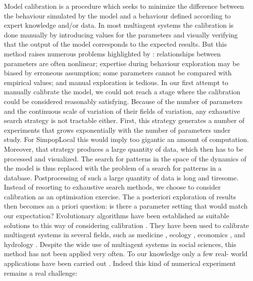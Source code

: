 Model calibration is a procedure which seeks to minimize the difference between the behaviour simulated by the model and a behaviour defined according to expert knowledge and/or data. In most multiagent systems the calibration is done manually by introducing values for the parameters and visually verifying that the output of the model corresponds to the expected results. But this method raises numerous problems highlighted by \textcite{Stonedahl2011a}: relationships between parameters are often nonlinear; expertise during behaviour exploration may be biased by erroneous assumption; some parameters cannot be compared with empirical values; and manual exploration is tedious. In our first attempt to manually calibrate the model, we could not reach a stage where the calibration could be considered reasonably satisfying. Because of the number of parameters and the continuous scale of variation of their fields of variation, any exhaustive search strategy is not tractable either. First, this strategy generates a number of experiments that grows exponentially with the number of parameters under study. For SimpopLocal this would imply too gigantic an amount of computation. Moreover, that strategy produces a large quantity of data, which then has to be processed and visualized. The search for patterns in the space of the dynamics of the model is thus replaced with the problem of a search for patterns in a database. Postprocessing of such a large quantity of data is long and tiresome. Instead of resorting to exhaustive search methods, we choose to consider calibration as an optimisation exercise. The a posteriori exploration of results then becomes an a priori question: is there a parameter setting that would match our expectation? Evolutionary algorithms have been established as suitable solutions to this way of considering calibration \autocites{Calvez2006, Stonedahl2011a}. They have been used to calibrate multiagent systems in several fields, such as medicine \autocite{Castiglione2007}, ecology \autocite{Duboz2010}, economics \autocites{Espinosa2012, Stonedahl2010a}, and hydrology \autocite{Solomatine1999}. Despite the wide use of multiagent systems in social sciences, this method has not been applied very often. To our knowledge only a few real- world applications have been carried out \autocites{Heppenstall2007, Stonedahl2010}. Indeed this kind of numerical experiment remains a real challenge: \begin{enumerate}[label=(\arabic*),labelindent=0pt, leftmargin=*]

\end{enumerate}
